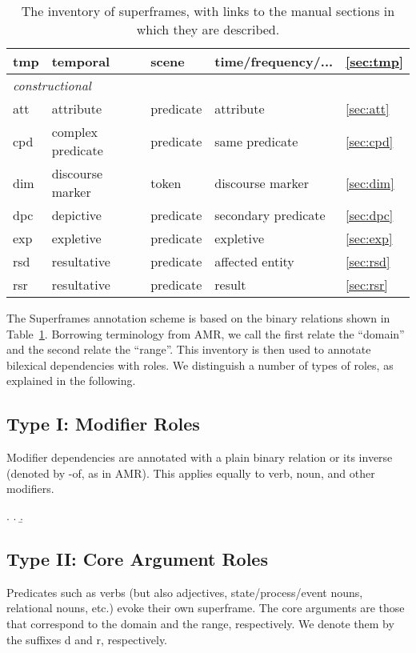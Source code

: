 \documentclass[a4paper]{article}
\begin{document}
\begin{table}
\begin{tabular}{lllll}
        tmp & temporal & scene & time/frequency/... & \ref{sec:tmp} \\
        \midrule
        \multicolumn{4}{l}{\emph{constructional}} \\
        att & attribute & predicate & attribute & \ref{sec:att} \\
        cpd & complex predicate & predicate & same predicate & \ref{sec:cpd} \\
        dim & discourse marker & token & discourse marker & \ref{sec:dim} \\
        dpc & depictive & predicate & secondary predicate & \ref{sec:dpc}\\
        exp & expletive & predicate & expletive & \ref{sec:exp} \\
        rsd & resultative & predicate & affected entity & \ref{sec:rsd} \\
        rsr & resultative & predicate & result & \ref{sec:rsr} \\
        \bottomrule
    \end{tabular}
    \caption{The inventory of superframes, with links to the manual sections in which they are described.}
    \label{tab:inventory}
\end{table}

The Superframes annotation scheme is based on the binary relations shown in Table~\ref{tab:inventory}. Borrowing terminology from AMR, we call the first relate the ``domain'' and the second relate the ``range''. This inventory is then used to annotate bilexical dependencies with roles. We distinguish a number of types of roles, as explained in the following.

\subsection{Type I: Modifier Roles}

Modifier dependencies are annotated with a plain binary relation or its inverse (denoted by \textsf{-of}, as in AMR). This applies equally to verb, noun, and other modifiers.

\ex. \a. 
     \b. 

\subsection{Type II: Core Argument Roles}

Predicates such as verbs (but also adjectives, state/process/event nouns, relational nouns, etc.) evoke their own superframe. The core arguments are those that correspond to the domain and the range, respectively. We denote them by the suffixes \textsf{d} and \textsf{r}, respectively.
\end{document}
